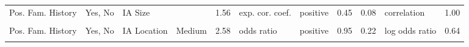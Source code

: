 \begin{landscape}
\begin{table}[!h]
{\begin{tabular}[t]{llllrllrrlr}
\addlinespace
Pos. Fam. History & Yes, No & IA Size &  & 1.56 & exp. cor. coef. & positive & 0.45 & 0.08 & correlation & 1.00\\
\cellcolor{gray!6}{Pos. Fam. History} & \cellcolor{gray!6}{Yes, No} & \cellcolor{gray!6}{IA Location} & \cellcolor{gray!6}{Low} & \cellcolor{gray!6}{0.71} & \cellcolor{gray!6}{odds ratio} & \cellcolor{gray!6}{negative} & \cellcolor{gray!6}{-0.34} & \cellcolor{gray!6}{0.18} & \cellcolor{gray!6}{log odds ratio} & \cellcolor{gray!6}{0.64}\\
Pos. Fam. History & Yes, No & IA Location & Medium & 2.58 & odds ratio & positive & 0.95 & 0.22 & log odds ratio & 0.64\\
\cellcolor{gray!6}{Pos. Fam. History} & \cellcolor{gray!6}{Yes, No} & \cellcolor{gray!6}{Ruptured IA} & \cellcolor{gray!6}{Yes, No} & \cellcolor{gray!6}{0.44} & \cellcolor{gray!6}{odds ratio} & \cellcolor{gray!6}{negative} & \cellcolor{gray!6}{-0.82} & \cellcolor{gray!6}{0.22} & \cellcolor{gray!6}{log odds ratio} & \cellcolor{gray!6}{1.00}\\
\bottomrule
\end{tabular}}
\end{table}
\end{landscape}